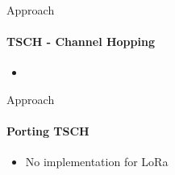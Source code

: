 \begin{frame}{Approach}
\framesubtitle{TSCH - Channel Hopping}

\begin{itemize}
    \item 
\end{itemize}
\end{frame}

\begin{frame}{Approach}
\framesubtitle{Porting TSCH}

\begin{itemize}
    \item No implementation for LoRa
\end{itemize}
\end{frame}
